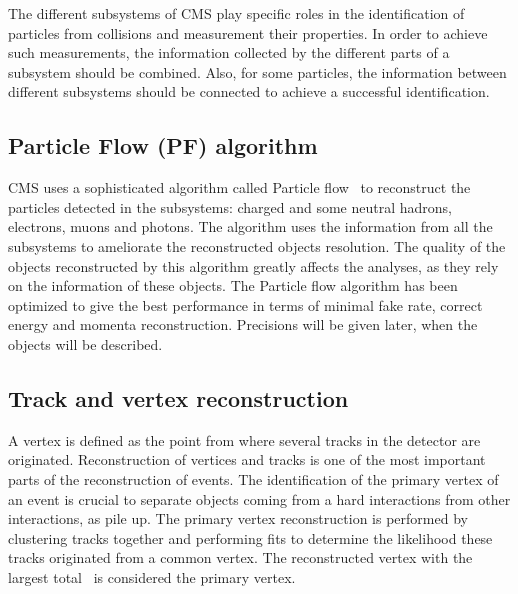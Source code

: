 The different subsystems of CMS play specific roles in the identification of particles from collisions and measurement their properties. In order to achieve such measurements, the information collected by the different parts of a subsystem should be combined. Also, for some particles, the information between different subsystems should be connected to achieve a successful identification.%

\subsection{Particle Flow (PF) algorithm}

CMS uses a sophisticated algorithm called Particle flow~\cite{CMS:2009nxa,CMS:2010eua,CMS:2010byl,CMS:2010aua} to reconstruct the particles detected in the subsystems: charged and some neutral hadrons, electrons, muons and photons. The algorithm uses the information from all the subsystems to ameliorate the reconstructed objects resolution.%
The quality of the objects reconstructed by this algorithm greatly affects the analyses, as they rely on the information of these objects. The Particle flow algorithm has been optimized to give the best performance in terms of minimal fake rate, correct energy and momenta reconstruction. Precisions will be given later, when the objects will be described.

\subsection{Track and vertex reconstruction}

A vertex is defined as the point from where several tracks in the detector are originated. Reconstruction of vertices and tracks is one of the most important parts of the reconstruction of events. The identification of the primary vertex of an event is crucial to separate objects coming from a hard interactions from other interactions, as pile up. The primary vertex reconstruction is performed by clustering tracks together and performing fits to determine the likelihood these tracks originated from a common vertex. The reconstructed vertex with the largest total \pt~is considered the primary vertex.

